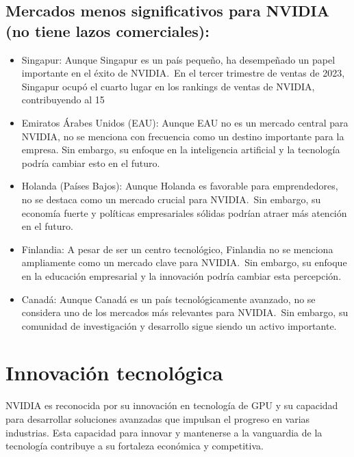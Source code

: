 \documentclass[conference]{IEEEtran}
\begin{document}
\subsection*{Mercados menos significativos para NVIDIA (no tiene lazos comerciales):}

\begin{itemize}
	\item Singapur:
	      Aunque Singapur es un país pequeño, ha desempeñado un
	      papel importante en el éxito de NVIDIA.~En el tercer trimestre de
	      ventas de 2023, Singapur ocupó el cuarto lugar en los rankings de ventas
	      de NVIDIA, contribuyendo al 15%

	\item Emiratos Árabes Unidos (EAU):
	      Aunque EAU no es un mercado central
	      para NVIDIA, no se menciona con frecuencia como un destino importante
	      para la empresa. Sin embargo, su enfoque en la inteligencia artificial y
	      la tecnología podría cambiar esto en el futuro.

	\item Holanda (Países Bajos):
	      Aunque Holanda es favorable para
	      emprendedores, no se destaca como un mercado crucial para NVIDIA.~Sin
	      embargo, su economía fuerte y políticas empresariales sólidas podrían
	      atraer más atención en el futuro.

	\item Finlandia:
	      A pesar de ser un centro tecnológico, Finlandia no se
	      menciona ampliamente como un mercado clave para NVIDIA.~Sin embargo,
	      su enfoque en la educación empresarial y la innovación podría
	      cambiar esta percepción.

	\item Canadá:
	      Aunque Canadá es un país tecnológicamente avanzado, no se
	      considera uno de los mercados más relevantes para NVIDIA.~Sin embargo, su
	      comunidad de investigación y desarrollo sigue siendo un activo importante.

\end{itemize}

\section{Innovación tecnológica}

NVIDIA es reconocida por su innovación en tecnología de GPU y su
capacidad para desarrollar soluciones avanzadas que impulsan el
progreso en varias industrias. Esta capacidad para innovar y
mantenerse a la vanguardia de la tecnología contribuye a su
fortaleza económica y competitiva.
\end{document}
